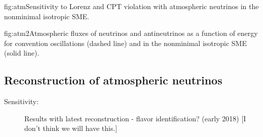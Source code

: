 \begin{dunefigure}{fig:atm}{Sensitivity to Lorenz and CPT violation with atmospheric neutrinos in the nonminimal isotropic SME.}
\end{dunefigure}

\begin{dunefigure}{fig:atm2}{Atmospheric fluxes of neutrinos and antineutrinos as a function of energy for convention oscillations (dashed line) and in the nonminimal isotropic SME (solid line).}
\end{dunefigure}


\subsection{Reconstruction of atmospheric neutrinos}
\label{sec:nonaccel-atm-reco}

\begin{description}
\item[Sensitivity:] Results with latest reconstruction - flavor identification?  (early 2018) [I don't think we will have this.]
\end{description}